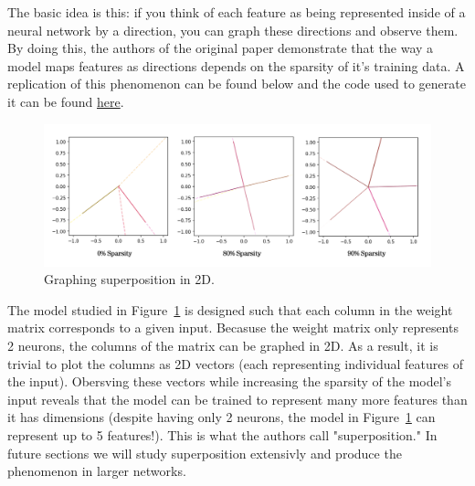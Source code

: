 \documentclass{article} %
\begin{document}
The basic idea is this: if you think of each feature as being represented inside of a
neural network by a direction, you can graph these directions and observe them.
By doing this, the authors of the original paper demonstrate that the way
a model maps features as directions depends on the sparsity of it's training data.
A replication of this phenomenon can be found below and the code used to 
generate it can be found 
\href{https://github.com/zroe1/toy_models_of_superposition/blob/main/section_1/section_1.ipynb}{here}.\\ 

\begin{figure}[h]
    \centering
    \includegraphics[width=0.6\linewidth]{section_1/images/section1_replicated_graphic.png}
    \captionsetup{font=footnotesize} %
    \caption{Graphing superposition in 2D.}
    \label{fig:section1_replication}
\end{figure}

The model studied in  Figure~\ref{fig:section1_replication} is designed such that 
each column in the weight matrix corresponds to a  given input. Becasuse the weight
matrix only represents 2 neurons, the columns of the matrix can be graphed in
2D. As a result, it is trivial to plot the columns as 2D vectors (each representing 
individual features of the input). Obersving these vectors while increasing the 
sparsity of the model's input reveals
that the model can be trained to represent many more features than it has dimensions
(despite having only 2 neurons, the model in Figure~\ref{fig:section1_replication} 
can represent up to 5 features!). This is what the authors call "superposition." In 
future sections we will study superposition extensivly and produce the phenomenon
in larger networks.
\end{document}

